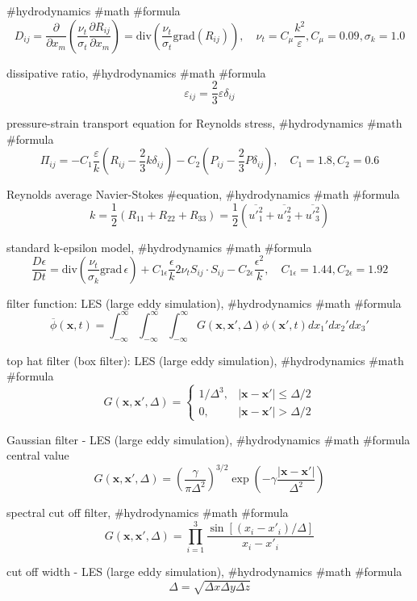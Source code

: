 #hydrodynamics #math #formula
$$
D_{ij}=\frac{\partial}{\partial x_m}\left(\frac{\nu_t}{\sigma_t}\frac{\partial R_{ij}}{\partial x_m}\right)=\mathrm{div}\left(\frac{\nu_t}{\sigma_t}\mathrm{grad}(R_{ij})\right),\quad \nu_t=C_\mu\frac{k^2}{\varepsilon},C_\mu=0.09,\sigma_k=1.0
$$

dissipative ratio, #hydrodynamics #math #formula
$$
\varepsilon_{ij}=\frac{2}{3}\varepsilon\delta_{ij}
$$

pressure-strain transport equation for Reynolds stress, #hydrodynamics #math #formula
$$
\Pi_{ij}=-C_1\frac{\varepsilon}{k}\left(R_{ij}-\frac{2}{3}k\delta_{ij}\right)-C_2\left(P_{ij}-\frac{2}{3}P\delta_{ij}\right), \quad C_1=1.8,C_2=0.6
$$

Reynolds average Navier-Stokes #equation, #hydrodynamics #math #formula
$$
k=\frac{1}{2}(R_{11}+R_{22}+R_{33})=\frac{1}{2}(\overline{u'^2_1}+\overline{u'^2_2}+\overline{u'^2_3})
$$

standard k-epsilon model, #hydrodynamics #math #formula
$$
\frac{D \epsilon}{D t}=\mathrm{div}\left(\frac{\nu_t}{\sigma_k}\mathrm{grad}\,\epsilon\right)+C_{1\epsilon}\frac{\epsilon}{k}2\nu_t S_{ij}\cdot S_{ij}-C_{2\epsilon}\frac{\epsilon^2}{k}, \quad C_{1\epsilon}=1.44,C_{2\epsilon}=1.92
$$

filter function: LES (large eddy simulation), #hydrodynamics #math #formula
$$
\overline{\phi}({\boldsymbol x},t)=\int^\infty_{-\infty}\int^\infty_{-\infty}\int^\infty_{-\infty}G({\boldsymbol x},{\boldsymbol x}',\Delta)\phi({\boldsymbol x}',t)dx_1'dx_2'dx_3'
$$

top hat filter (box filter): LES (large eddy simulation), #hydrodynamics #math #formula
$$
G({\boldsymbol x},{\boldsymbol x}',\Delta)=
\left\{
\begin{array}{ll}
1/\Delta^3, & |{\boldsymbol x}-{\boldsymbol x}'|\le\Delta/2 \\
0, & |{\boldsymbol x}-{\boldsymbol x}'|>\Delta/2
\end{array}
\right.
$$

Gaussian filter - LES (large eddy simulation), #hydrodynamics #math #formula
central value 
$$
G({\boldsymbol x},{\boldsymbol x}',\Delta)=\left(\frac{\gamma}{\pi\Delta^2}\right)^{3/2}\exp\left(-\gamma\frac{|{\boldsymbol x}-{\boldsymbol x}'|}{\Delta^2}\right)
$$

spectral cut off filter, #hydrodynamics #math #formula
$$
G({\boldsymbol x},{\boldsymbol x}',\Delta)=\prod^3_{i=1}\frac{\sin[(x_i-x'_i)/\Delta]}{x_i-x'_i}
$$

cut off width - LES (large eddy simulation), #hydrodynamics #math #formula
$$
\Delta=\sqrt{\Delta x\Delta y\Delta z}
$$

